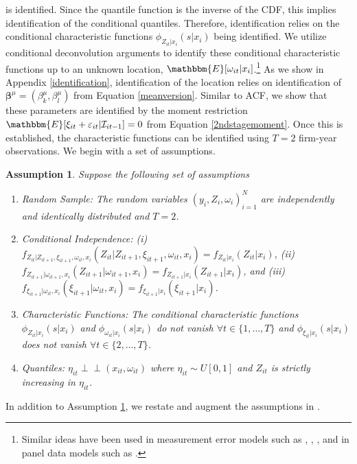 \documentclass[12pt]{article}
\newtheorem{assump}{Assumption}[section]
\newcommand{\indep}{\perp \!\!\! \perp}
\begin{document}
is identified. Since the quantile function is the inverse of the CDF, this implies identification of the conditional quantiles. Therefore, identification relies on the conditional characteristic functions $\phi_{Z_{it}|x_{i}}(s|x_{i})$ being identified. We utilize conditional deconvolution arguments to identify these conditional characteristic functions up to an unknown location, $\mathbbm{E}[\omega_{it}|x_{i}]$.\footnote{Similar ideas have been used in measurement error models such as \cite{Li1998}, \cite{Schennach2004}, \cite{Song2015}, and in panel data models such as \cite{Neumann2007}.} As we show in Appendix \ref{identification}, identification of the location relies on identification of $\boldsymbol{\beta}^{\mu}=(\beta_{k}^{\mu}, \beta_{l}^{\mu})$ from Equation \eqref{meanversion}. Similar to ACF, we show that these parameters are identified by the moment restriction $\mathbbm{E}[\xi_{it}+\varepsilon_{it}|\mathcal{I}_{it-1}]=0$ from Equation \eqref{2ndstagemoment}. Once this is established, the characteristic functions can be identified using $T=2$ firm-year observations. We begin with a set of assumptions.
\begin{assump} \label{idpart1}
Suppose the following set of assumptions 
	\begin{enumerate}[label=(\alph*)]
		\item Random Sample: The random variables $(y_{i}, Z_{i}, \omega_{i})_{i=1}^{N}$ are independently and identically distributed and $T=2$.
		\item Conditional Independence: (i) $f_{Z_{it}|Z_{it+1}, \xi_{it+1}, \omega_{it}, x_{i}}(Z_{it}|Z_{it+1}, \xi_{it+1}, \omega_{it}, x_{i})=f_{Z_{it}|x_{i}}(Z_{it}|x_{i})$, (ii) $f_{Z_{it+1}|\omega_{it+1}, x_{i}}(Z_{it+1}|\omega_{it+1}, x_{i})=f_{Z_{it+1}|x_{i}}(Z_{it+1}|x_{i})$,  and (iii) $f_{\xi_{it+1}|\omega_{it}, x_{i}}(\xi_{it+1}|\omega_{it}, x_{i})=f_{\xi_{it+1}|x_{i}}(\xi_{it+1}|x_{i})$.
		\item Characteristic Functions: The conditional characteristic functions $\phi_{Z_{it}|x_{i}}(s|x_{i})$ and $\phi_{\omega_{it}|x_{i}}(s|x_{i})$ do not vanish $\forall t\in\{1,\dots,T\}$ and $\phi_{\xi_{it}|x_{i}}(s|x_{i})$ does not vanish $\forall t\in\{2,\dots,T\}$.
		\item Quantiles: $\eta_{it}\indep (x_{it}, \omega_{it})$ where $\eta_{it}\sim U[0,1]$ and $Z_{it}$ is strictly increasing in $\eta_{it}$.
	\end{enumerate}
\end{assump}
In addition to Assumption \ref{idpart1}, we restate and augment the assumptions in \cite{Ackerberg2015}.
\end{document}
